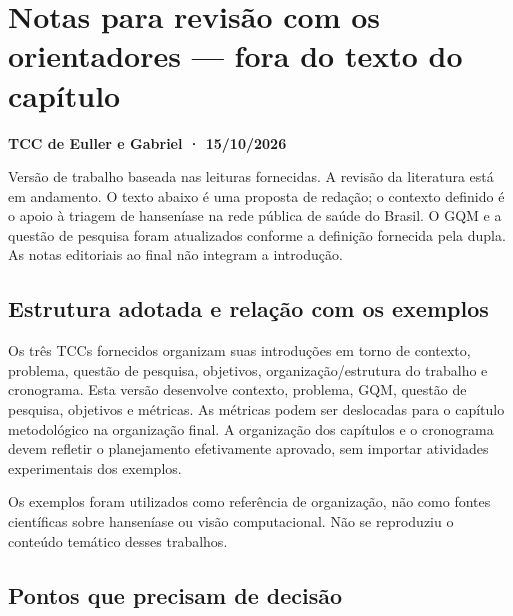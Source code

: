 \chapter{Notas para revisão com os orientadores --- fora do texto do capítulo}

\textbf{TCC de Euller e Gabriel · 15/10/2026}

Versão de trabalho baseada nas leituras fornecidas. A revisão da
literatura está em andamento. O texto abaixo é uma proposta de redação;
o contexto definido é o apoio à triagem de hanseníase na rede pública de
saúde do Brasil. O GQM e a questão de pesquisa foram atualizados
conforme a definição fornecida pela dupla. As notas editoriais ao final
não integram a introdução.

\section{Estrutura adotada e relação com os
exemplos}\label{estrutura-adotada-e-relauxe7uxe3o-com-os-exemplos}

Os três TCCs fornecidos organizam suas introduções em torno de contexto,
problema, questão de pesquisa, objetivos, organização/estrutura do
trabalho e cronograma. Esta versão desenvolve contexto, problema, GQM,
questão de pesquisa, objetivos e métricas. As métricas podem ser
deslocadas para o capítulo metodológico na organização final. A
organização dos capítulos e o cronograma devem refletir o planejamento
efetivamente aprovado, sem importar atividades experimentais dos
exemplos.

Os exemplos foram utilizados como referência de organização, não como
fontes científicas sobre hanseníase ou visão computacional. Não se
reproduziu o conteúdo temático desses trabalhos.

\section{Pontos que precisam de
decisão}\label{pontos-que-precisam-de-decisuxe3o}

